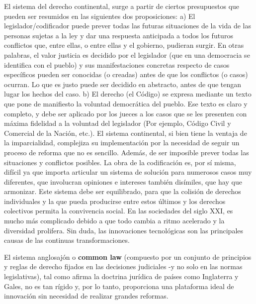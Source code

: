 \documentclass[12pt]{report} %
\begin{document}
\begin{itemize}
El sistema del derecho continental, surge a partir de ciertos presupuestos que pueden ser resumidos en las siguientes dos proposiciones: a) El legislador/codificador puede prever todas las futuras situaciones de la vida de las personas sujetas a la ley y dar una respuesta anticipada a todos los futuros conflictos que, entre ellas, o entre ellas y el gobierno, pudieran surgir. En otras palabras, el valor justicia es decidido por el legislador (que en una democracia se identifica con el pueblo) y sus manifestaciones concretas respecto de casos específicos pueden ser conocidas (o creadas) antes de que los conflictos (o casos) ocurran. Lo que es justo puede ser decidido en abstracto, antes de que tengan lugar los hechos del caso. b) El derecho (el Código) se expresa mediante un texto que pone de manifiesto la voluntad democrática del pueblo. Ese texto es claro y completo, y debe ser aplicado por los jueces a los casos que se les presenten con máxima fidelidad a la voluntad del legislador (Por ejemplo, Código Civil y Comercial de la Nación, etc.). El sistema continental, si bien tiene la ventaja de la imparcialidad, complejiza su implementación por la necesidad de seguir un proceso de reforma que no es sencillo. Además, de ser imposible prever todas las situaciones y conflictos posibles. La obra de la codificación es, por sí misma, difícil ya que importa articular un sistema de solución para numerosos casos muy diferentes, que involucran opiniones e intereses también disímiles, que  hay  que armonizar. Este sistema debe ser equilibrado, para que la colisión de derechos individuales y la que pueda producirse entre estos últimos y los derechos colectivos permita la convivencia social. En las sociedades del siglo XXI, es mucho más complicado debido a que todo cambia a ritmo acelerado y la diversidad prolifera. Sin duda, las innovaciones tecnológicas son las principales causas de las continuas transformaciones.

El sistema anglosajón o \textbf{common  law}  (compuesto  por  un  conjunto  de principios y reglas de derecho fijados en las decisiones judiciales -y no solo en las normas legislativas), tal como afirma la doctrina jurídica de países como Inglaterra y Gales, no es tan rígido y, por lo tanto, proporciona una plataforma ideal de innovación sin necesidad de realizar grandes reformas. 


\end{itemize}
\end{document}
